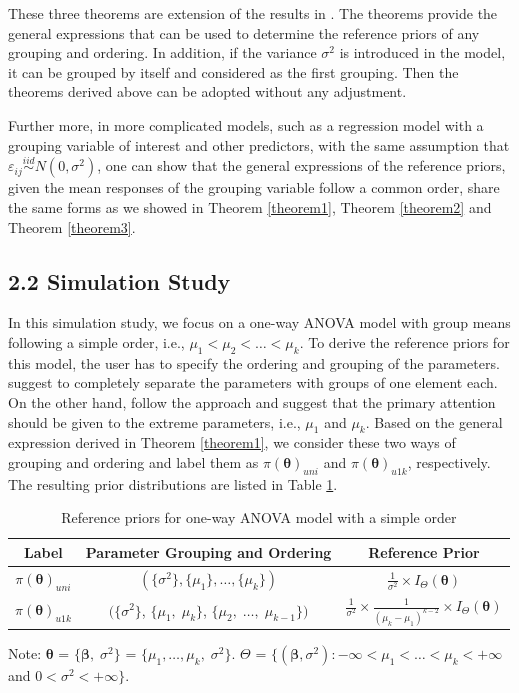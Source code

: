 \documentclass[Proceedings]{ascelike}
\begin{document}
These three theorems are extension of the results in \cite{Sonksen2012}. The theorems provide the general expressions that can be used to determine the reference priors of any grouping and ordering. In addition, if the variance $\sigma^2$ is introduced in the model, it can be grouped by itself and considered as the first grouping. Then the theorems derived above can be adopted without any adjustment.


Further more, in more complicated models, such as a regression model with a grouping variable of interest and other predictors, with the same assumption that $\varepsilon_{ij}\overset{iid}{\sim}N(0,\sigma^2)$, one can show that the general expressions of the reference priors, given the mean responses of the grouping variable follow a common order, share the same forms as we showed in Theorem \ref{theorem1}, Theorem \ref{theorem2} and Theorem \ref{theorem3}.
\subsection{2.2 Simulation Study}
In this simulation study, we focus on a one-way ANOVA model with group means following a simple order, i.e., $\mu_1<\mu_2<\hdots<\mu_k$. To derive the reference priors for this model, the user has to specify the ordering and grouping of the parameters. \cite{BergerBernardo1992} suggest to completely separate the parameters with groups of one element each. On the other hand, \cite{Sonksen2012} follow the \cite{NichollsJones} approach and suggest that the primary attention should be given to the extreme parameters, i.e., $\mu_1$ and $\mu_k$. Based on the general expression derived in Theorem \ref{theorem1}, we consider these two ways of grouping and ordering and label them as $\pi(\pmb\theta)_{uni}$ and $\pi(\pmb\theta)_{u1k}$, respectively. The resulting prior distributions are listed in Table \ref{tab:ref}.
\begin{table}[h!]
\centering
\begin{threeparttable}
\caption{Reference priors for one-way ANOVA model with a simple order}
\begin{tabular}{c|c|c}
\multirow{1}{*}{Label}&Parameter Grouping and Ordering&Reference Prior\\
\hline
\multirow{1}{*}{$\pi(\pmb\theta)_{uni}$}&$(\{\sigma^2\}, \{\mu_1\}, \hdots, \{\mu_k\})$&$\frac{1}{\sigma^2}\times I_{\Theta}(\boldsymbol{\theta})$\\
\multirow{1}{*}{$\pi(\pmb\theta)_{u1k}$}&$(\{\sigma^2\}$, $\{\mu_1,\;\mu_k\}$, $\{\mu_2,\; \hdots,\; \mu_{k-1}\})$&$\frac{1}{\sigma^2}\times\frac{1}{{(\mu_k-\mu_1)}^{k-2}}\times I_{\Theta}(\boldsymbol{\theta})$
\end{tabular}
\begin{tablenotes}
\item Note: $\pmb\theta$ = $\{\pmb\beta,\;\sigma^2\}$ = $\{\mu_1,\hdots,\mu_k,\;\sigma^2\}$. $\Theta$ = $\{(\pmb\beta,\sigma^2) : -\infty<\mu_1<\hdots<\mu_k< +\infty $ and $0<\sigma^2< +\infty \}$.
\end{tablenotes}
\label{tab:ref}
\end{threeparttable}
\end{table}
\end{document}
